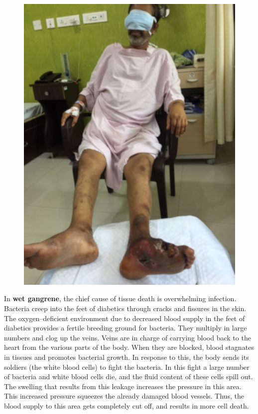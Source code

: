 \begin{figure}[h]
\centering
\includegraphics[scale=1.4]{images/068.jpg}
\end{figure}

In \textbf{wet gangrene}, the chief cause of tissue death is overwhel\-ming infection. Bacteria creep into the feet of diabetics through cracks and fissures in the skin. The oxygen–deficient environment due to decrea\-sed blood supply in the feet of diabetics provides a fertile breeding ground for bacteria. They multiply in large numbers and clog up the veins. Veins are in charge of carrying blood back to the heart from the various parts of the body. When they are blocked, blood stagnates in tissues and promotes bacterial growth. In response to this, the body sends its soldiers (the white blood cells) to fight the bacteria. In this fight a large number of bacteria and white blood cells die, and the fluid content of these cells spill out. The swelling that results from this leakage increases the pressure in this area. This increased pressure squeezes the already damaged blood vessels. Thus, the blood supply to this area gets completely cut off, and results in more cell death.

